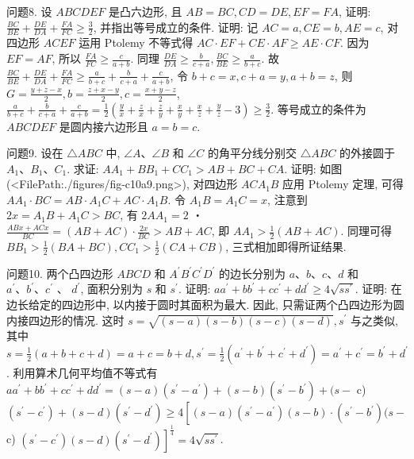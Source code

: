 问题8. 设 $A B C D E F$ 是凸六边形, 且 $A B=B C, C D=D E, E F=F A$, 证明: $\frac{B C}{B E}+\frac{D E}{D A}+\frac{F A}{F C} \geqslant \frac{3}{2}$, 并指出等号成立的条件.
证明: 记 $A C=a, C E=b, A E=c$, 对四边形 $A C E F$ 运用 Ptolemy 不等式得 $A C \cdot E F+C E \cdot A F \geqslant A E \cdot C F$. 因为 $E F=A F$, 所以 $\frac{F A}{F C} \geqslant \frac{c}{a+b}$. 同理 $\frac{D E}{D A} \geqslant \frac{b}{c+a}, \frac{B C}{B E} \geqslant \frac{a}{b+c}$. 故 $\frac{B C}{B E}+\frac{D E}{D A}+\frac{F A}{F C} \geqslant \frac{a}{b+c}+\frac{b}{c+a}+\frac{c}{a+b}$, 令 $b+ c=x, c+a=y, a+b=z$, 则 $G=\frac{y+z-x}{2}, b=\frac{z+x-y}{2}, c=\frac{x+y-z}{2}$, $\frac{a}{b+c}+\frac{b}{c+a}+\frac{c}{a+b}=\frac{1}{2}\left(\frac{y}{x}+\frac{z}{x}+\frac{z}{y}+\frac{x}{y}+\frac{x}{z}+\frac{y}{z}-3\right) \geqslant \frac{3}{2}$. 等号成立的条件为 $A B C D E F$ 是圆内接六边形且 $a=b=c$.



问题9. 设在 $\triangle A B C$ 中, $\angle A 、 \angle B$ 和 $\angle C$ 的角平分线分别交 $\triangle A B C$ 的外接圆于 $A_1 、 B_1 、 C_1$. 求证: $A A_1+B B_1+C C_1>A B+B C+C A$.
证明: 如图(<FilePath:./figures/fig-c10a9.png>), 对四边形 $A C A_1 B$ 应用 Ptolemy 定理, 可得 $A A_1 \cdot B C=A B \cdot A_1 C+A C \cdot A_1 B$. 令 $A_1 B=A_1 C=x$, 注意到 $2 x=A_1 B+A_1 C>B C$, 有 $2 A A_1=2$ ・ $\frac{A B x+A C x}{B C}=(A B+A C) \cdot \frac{2 x}{B C}>A B+A C$, 即 $A A_1> \frac{1}{2}(A B+A C)$. 同理可得 $B B_1>\frac{1}{2}(B A+B C), C C_1> \frac{1}{2}(C A+C B)$, 三式相加即得所证结果.



问题10. 两个凸四边形 $A B C D$ 和 $A^{\prime} B^{\prime} C^{\prime} D^{\prime}$ 的边长分别为 $a 、 b 、 c 、 d$ 和 $a^{\prime} 、 b^{\prime} 、 c^{\prime}$ 、 $d^{\prime}$, 面积分别为 $s$ 和 $s^{\prime}$. 证明: $a a^{\prime}+b b^{\prime}+c c^{\prime}+d d^{\prime} \geqslant 4 \sqrt{s s^{\prime}}$.
证明: 在边长给定的四边形中, 以内接于圆时其面积为最大.
因此, 只需证两个凸四边形为圆内接四边形的情况.
这时 $s= \sqrt{(s-a)(s-b)(s-c)(s-d)}, s^{\prime}$ 与之类似, 其中 $s=\frac{1}{2}(a+b+c+d)=a+ c=b+d, s^{\prime}=\frac{1}{2}\left(a^{\prime}+b^{\prime}+c^{\prime}+d^{\prime}\right)=a^{\prime}+c^{\prime}=b^{\prime}+d^{\prime}$. 利用算术几何平均值不等式有 $a a^{\prime}+b b^{\prime}+c c^{\prime}+d d^{\prime}=(s-a)\left(s^{\prime}-a^{\prime}\right)+(s-b)\left(s^{\prime}-b^{\prime}\right)+(s-$ c) $\left(s^{\prime}-c^{\prime}\right)+(s-d)\left(s^{\prime}-d^{\prime}\right) \geqslant 4\left[(s-a)\left(s^{\prime}-a^{\prime}\right)(s-b) \cdot\left(s^{\prime}-b^{\prime}\right)(s-\right.$ c) $\left.\left(s^{\prime}-c^{\prime}\right)(s-d)\left(s^{\prime}-d^{\prime}\right)\right]^{\frac{1}{4}}=4 \sqrt{s s^{\prime}}$.



